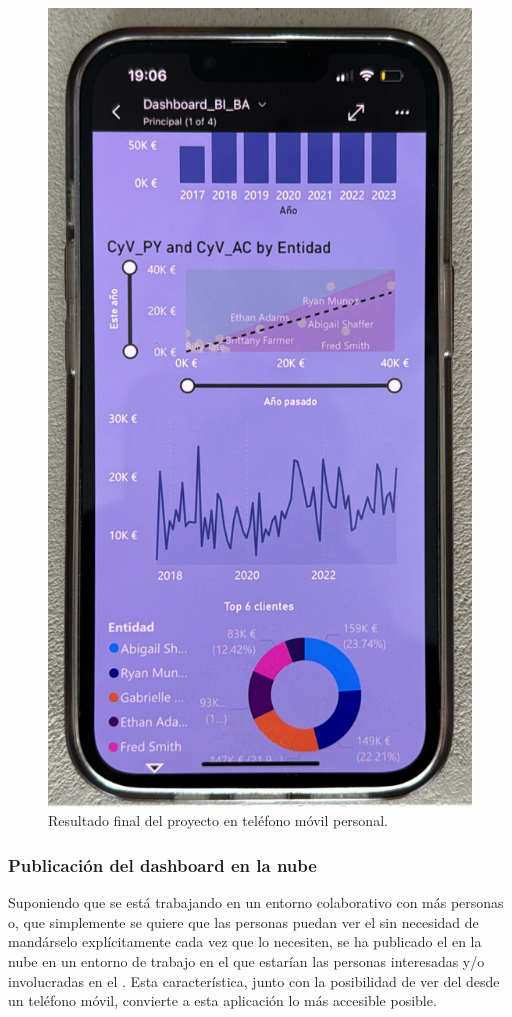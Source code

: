 \begin{figure}[H]
	\centering
	\includegraphics[scale =  0.2]{imgs/PBImovil.jpeg}
	\caption{Resultado final del proyecto en teléfono móvil personal.}
	\label{PBImovil}
\end{figure}


\subsubsection{Publicación del dashboard en la nube}
Suponiendo que se está trabajando en un entorno colaborativo con más personas o, que simplemente se quiere que las personas puedan ver el  sin necesidad de mandárselo explícitamente cada vez que lo necesiten, se ha publicado el  en la nube en un entorno de trabajo en el que estarían las personas interesadas y/o involucradas en el . Esta característica, junto con la posibilidad de ver del  desde un teléfono móvil, convierte a esta aplicación lo más accesible posible.

